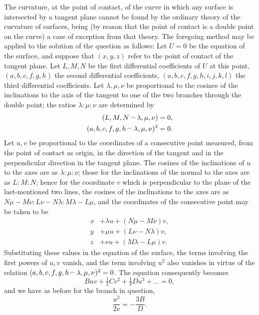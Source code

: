 \documentclass[11pt,a4paper]{article}
\theoremstyle{plain}
\begin{document}
The curvature, at the point of contact, of the curve in which any surface is intersected by a tangent plane cannot be found by the ordinary theory of the curvature of surfaces, being (by reason that the point of contact is a double point on the curve) a case of exception from that theory. The foregoing method may be applied to the solution of the question as follows: Let $U = 0$ be the equation of the surface, and suppose that $(x, y, z)$ refer to the point of contact of the tangent plane. Let $L, M, N$ be the first differential coefficients of $U$ at this point, $(a, b, c, f, g, h)$ the second differential coefficients, $(a, b, c, f, g, h, i, j, k, l)$ the third differential coefficients. Let $\lambda, \mu, \nu$ be proportional to the cosines of the inclinations to the axis of the tangent to one of the two branches through the double point; the ratios $\lambda : \mu : \nu$ are determined by
\begin{align*}
(L, M, N \mathbin{\vcenter{\hbox{$\scriptstyle\!\frown$}}} \lambda, \mu, \nu) &= 0,\\
(a, b, c, f, g, h \mathbin{\vcenter{\hbox{$\scriptstyle\!\frown$}}} \lambda, \mu, \nu)^2 &= 0.
\end{align*}
Let $u, v$ be proportional to the coordinates of a consecutive point measured, from the point of contact as origin, in the direction of the tangent and in the perpendicular direction in the tangent plane. The cosines of the inclinations of $u$ to the axes are as $\lambda : \mu : \nu$; those for the inclinations of the normal to the axes are as $L : M : N$; hence for the coordinate $v$ which is perpendicular to the plane of the last-mentioned two lines, the cosines of the inclinations to the axes are as $N\mu - M\nu : L\nu - N\lambda : M\lambda - L\mu$, and the coordinates of the consecutive point may be taken to be
\begin{align*}
x &+ \lambda u + (N\mu - M\nu)v,\\
y &+ \mu u + (L\nu - N\lambda)v,\\
z &+ \nu u + (M\lambda - L\mu)v.
\end{align*}
Substituting these values in the equation of the surface, the terms involving the first powers of $u, v$ vanish, and the term involving $u^2$ also vanishes in virtue of the relation $(a, b, c, f, g, h \mathbin{\vcenter{\hbox{$\scriptstyle\!\frown$}}} \lambda, \mu, \nu)^2 = 0$. The equation consequently becomes
\[
Buv + \tfrac{1}{2}Cv^2 + \tfrac{1}{3}Du^3 + \ldots = 0,
\]
and we have as before for the branch in question,
\[
\frac{u^2}{2v} = -\frac{3B}{D}.
\]
\end{document}
